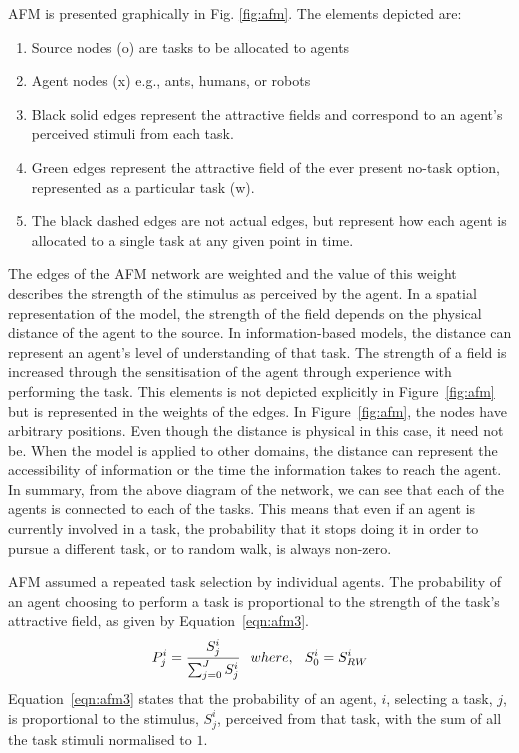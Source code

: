 \documentclass[smallcondensed]{svjour3}
\begin{document}
AFM is presented graphically in Fig. \ref{fig:afm}.  The elements depicted are:
\begin{enumerate}
\item Source nodes (o) are tasks to be allocated to agents
\item Agent nodes (x) e.g., ants, humans, or robots
\item Black solid edges represent the attractive fields and correspond to an agent's perceived stimuli from each task.
\item Green edges represent the attractive field of the ever present no-task option, represented as a particular task (w).
\item The black dashed edges are not actual edges, but represent how each agent is allocated to a single task at any given point in time.
\end{enumerate}

The edges of the AFM network are weighted and the value of this weight describes the strength of the stimulus as perceived by the agent.  In a spatial representation of the model, the strength of the field depends on the physical distance of the agent to the source.  In information-based models, the distance can represent an agent's level of understanding of that task.  The strength of a field is increased through the sensitisation of the agent through experience with performing the task.  This elements is not depicted explicitly in Figure~\ref{fig:afm} but is represented in the weights of the edges.  In Figure~\ref{fig:afm}, the nodes have arbitrary positions.  Even though the distance is physical in this case, it need not be.  When the model is applied to other domains, the distance can represent the accessibility of information or the time the information takes to reach the agent. 
In summary, from the above diagram of the network, we can see that each of the agents is connected to each of the tasks. This means that even if an agent is currently involved in a task, the probability that it stops doing it in order to pursue a different task, or to random walk, is always non-zero.

AFM assumed a repeated task selection by individual agents.  The probability of an agent choosing to perform a task is proportional to the strength of the task's attractive field, as given by Equation~\ref{eqn:afm3}.
\begin{equation}
P_{j}^{i} = \frac{S_{j}^{i}}{\sum_{j=0}^{J} S_{j}^{i}} \hspace*{0.25cm}where,\hspace*{0.25cm}S^{i}_{0} = S^{i}_{RW}   
\label{eqn:afm3}
\end{equation}
Equation~\ref{eqn:afm3} states that the probability of an agent, $i$, selecting a task, $j$, is proportional to the stimulus, $ S^i_j$, perceived from that task, with the sum of all the task stimuli normalised to $1$.
\end{document}
